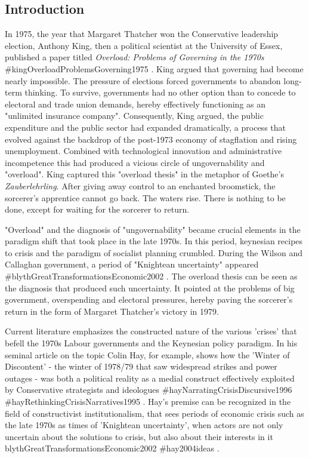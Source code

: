 \documentclass[
]{article}
\author{}
\date{}
\begin{document}
\hypertarget{header-n0}{%
\subsection{Introduction}\label{header-n0}}

In 1975, the year that Margaret Thatcher won the Conservative leadership
election, Anthony King, then a political scientist at the University of
Essex, published a paper titled \emph{Overload: Problems of Governing in
the 1970s} \#kingOverloadProblemsGoverning1975 . King argued that
governing had become nearly impossible. The pressure of elections forced
governments to abandon long-term thinking. To survive, governments had
no other option than to concede to electoral and trade union demands,
hereby effectively functioning as an "unlimited insurance company".
Consequently, King argued, the public expenditure and the public sector
had expanded dramatically, a process that evolved against the backdrop
of the post-1973 economy of stagflation and rising unemployment.
Combined with technological innovation and administrative incompetence
this had produced a vicious circle of ungovernability and "overload".
King captured this "overload thesis" in the metaphor of Goethe's
\emph{Zauberlehrling}. After giving away control to an enchanted
broomstick, the sorcerer's apprentice cannot go back. The waters rise.
There is nothing to be done, except for waiting for the sorcerer to
return.

"Overload" and the diagnosis of "ungovernability" became crucial
elements in the paradigm shift that took place in the late 1970s. In
this period, keynesian recipes to crisis and the paradigm of socialist
planning crumbled. During the Wilson and Callaghan government, a period
of "Knightean uncertainty" appeared
\#blythGreatTransformationsEconomic2002 . The overload thesis can be
seen as the diagnosis that produced such uncertainty. It pointed at the
problems of big government, overspending and electoral pressures, hereby
paving the sorcerer's return in the form of Margaret Thatcher's victory
in 1979.

Current literature emphasizes the constructed nature of the various
'crises' that befell the 1970s Labour governments and the Keynesian
policy paradigm. In his seminal article on the topic Colin Hay, for
example, shows how the 'Winter of Discontent' - the winter of 1978/79
that saw widespread strikes and power outages - was both a political
reality as a medial construct effectively exploited by Conservative
strategists and ideologues \#hayNarratingCrisisDiscursive1996
\#hayRethinkingCrisisNarratives1995 . Hay's premise can be recognized in
the field of constructivist institutionalism, that sees periods of
economic crisis such as the late 1970s as times of 'Knightean
uncertainty', when actors are not only uncertain about the solutions to
crisis, but also about their interests in it
blythGreatTransformationsEconomic2002 \#hay2004ideas .
\end{document}

